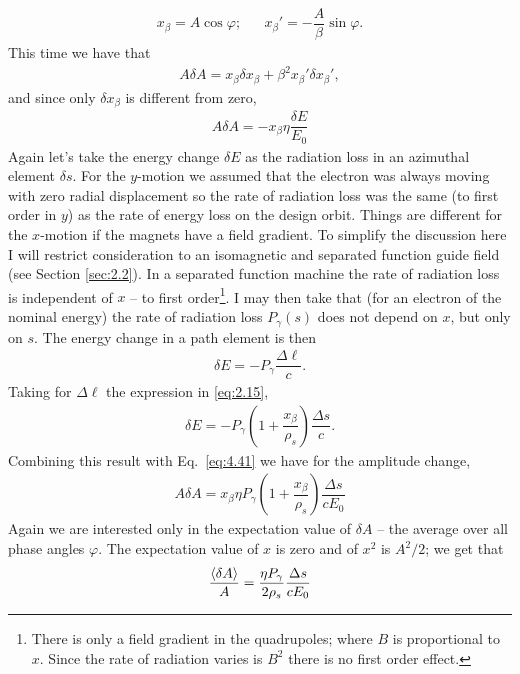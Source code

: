 \begin{align}
	x_\beta = A \cos \varphi; && x_\beta' = - \dfrac{A}{\beta} \sin \varphi.
\end{align}
This time we have that
\begin{align}
	A \delta A = x_\beta \delta x_\beta + \beta^2 x_\beta' \delta x_\beta',
\end{align}
and since only $\delta x_\beta$ is different from zero,
\begin{align} \label{eq:4.41}
	A \delta A = - x_\beta \eta \dfrac{\delta E}{E_0}
\end{align}
Again let's take the energy change $\delta E$ as the radiation loss in an azimuthal element $\delta s$. For the $y$-motion we assumed that the electron was always moving with zero radial displacement so the rate of radiation loss was the same (to first order in $y$) as the rate of energy loss on the design orbit. Things are different for the $x$-motion if the magnets have a field gradient. To simplify the discussion here I will restrict consideration to an isomagnetic
 and separated function guide field (see Section \ref{sec:2.2}). In a separated function machine the rate of radiation loss is independent of $x$ -- to first order\footnote{There is only a field gradient in the quadrupoles; where $B$ is proportional to $x$. Since the rate of radiation varies is $B^2$ there is no first order effect.}. I may then take that (for an electron of the nominal energy) the rate of radiation loss $P_\gamma(s)$ does not depend on $x$, but only on $s$.
The energy change in a path element is then
\begin{align}
	\delta E = - P_\gamma \dfrac{\Delta \ell}{c}.
\end{align}
Taking for $\Delta \ell$ the expression in \eqref{eq:2.15},
\begin{align}
	\delta E = - P_\gamma \left( 1 + \dfrac{x_\beta}{\rho_s} \right) \dfrac{\Delta s}{c} .
\end{align}
Combining this result with Eq.~\eqref{eq:4.41} we have for the amplitude change,
\begin{align}
	A \delta A = x_\beta \eta P_\gamma \left( 1 + \dfrac{x_\beta}{\rho_s} \right) \dfrac{\Delta s}{cE_0}
\end{align}
Again we are interested only in the expectation value of $\delta A$ -- the average over all
phase angles $\varphi$. The expectation value of $x$ is zero and of $x^2$ is $A^2/2$; we get that
\begin{align}
	\dfrac{\left< \delta A \right>}{A} = \dfrac{\eta P_\gamma}{2 \rho_s} \dfrac{\Delta s}{cE_0}
\end{align}

